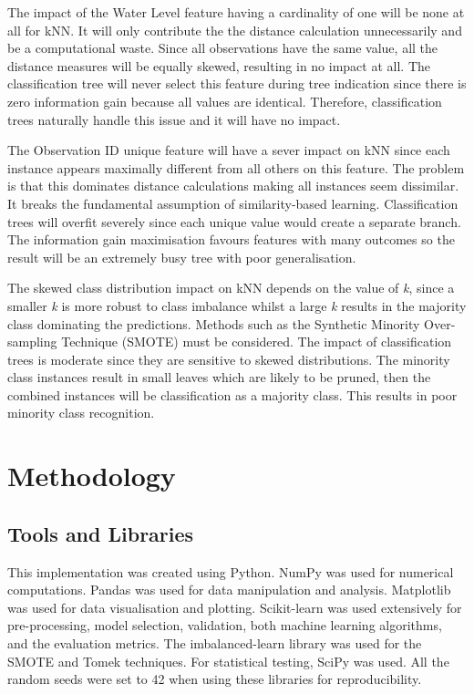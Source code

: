 \documentclass[10pt, conference]{IEEEtran}
\begin{document}
The impact of the Water Level feature having a cardinality of one will be none at all for kNN. It will only contribute the the distance calculation unnecessarily and be a computational waste. Since all observations have the same value, all the distance measures will be equally skewed, resulting in no impact at all. The classification tree will never select this feature during tree indication since there is zero information gain because all values are identical. Therefore, classification trees naturally handle this issue and it will have no impact.

The Observation ID unique feature will have a sever impact on kNN since each instance appears maximally different from all others on this feature. The problem is that this dominates distance calculations making all instances seem dissimilar. It breaks the fundamental assumption of similarity-based learning. Classification trees will overfit severely since each unique value would create a separate branch. The information gain maximisation favours features with many outcomes so the result will be an extremely busy tree with poor generalisation.

The skewed class distribution impact on kNN depends on the value of \textit{k}, since a smaller \textit{k} is more robust to class imbalance whilst a large \textit{k} results in the majority class dominating the predictions. Methods such as the Synthetic Minority Over-sampling Technique (SMOTE) must be considered. The impact of classification trees is moderate since they are sensitive to skewed distributions. The minority class instances result in small leaves which are likely to be pruned, then the combined instances will be classification as a majority class. This results in poor minority class recognition.

\section{Methodology}
\subsection{Tools and Libraries}
This implementation was created using Python. NumPy\cite{harris2020array} was used for numerical computations. Pandas\cite{reback2020pandas} was used for data manipulation and analysis. Matplotlib\cite{Hunter:2007} was used for data visualisation and plotting. Scikit-learn\cite{scikit-learn} was used extensively for pre-processing, model selection, validation, both machine learning algorithms, and the evaluation metrics. The imbalanced-learn library\cite{JMLR:v18:16-365} was used for the SMOTE and Tomek techniques. For statistical testing, SciPy\cite{2020SciPy-NMeth} was used. All the random seeds were set to 42 when using these libraries for reproducibility.
\end{document}
